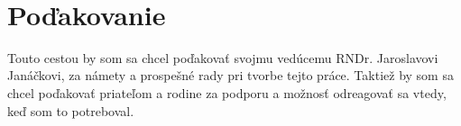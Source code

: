 ~\vfill
\section*{Poďakovanie}
Touto cestou by som sa chcel poďakovať svojmu vedúcemu RNDr. Jaroslavovi Janáčkovi, za námety a prospešné rady pri tvorbe tejto práce. Taktiež by som sa chcel poďakovať priateľom a rodine za podporu a možnosť odreagovať sa vtedy, keď som to potreboval.

\vspace{3cm}
